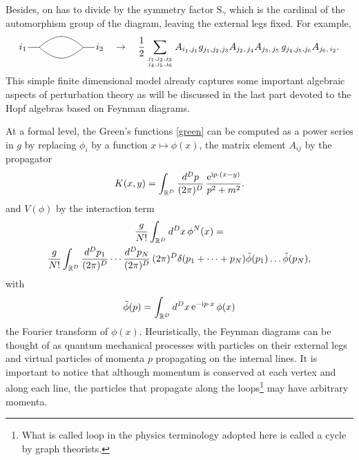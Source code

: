 \documentclass[12pt,here,feynmf]{article}
\begin{document}
Besides, on has to divide by the symmetry factor $\mathrm{S}_{\gamma}$ which is the cardinal of the automorphism group of the diagram, leaving the external legs fixed. For example,
\begin{equation}
i_{1}\,
\xy
(0,0)*{}="A"; 
(16,0)*{}="B"; 
(-4,0)*{}="C"; 
(20,0)*{}="D"; 
"C"; "A" **\crv{(-4,0)&(0,0)};
"A"; "B" **\crv{(0,0)&(8,8)&(16,0)};
"A"; "B" **\crv{(0,0)&(8,-8)&(16,0)};
"B"; "D" **\crv{(16,0)&(20,0)};
\endxy
\,i_{2}\quad
\rightarrow\quad
\frac{1}{2}
\sum_{j_{1},j_{2},j_{3}\atop
j_{4},j_{5},j_{6}}
A_{i_{1},j_{1}}
g_{j_{1},j_{2},j_{3}}
A_{j_{2},\,j_{4}}A_{j_{3},\,j_{5}}\,
g_{j_{4},j_{5},j_{6}}
A_{j_{6},\,i_{2}}.
\end{equation}
This simple finite dimensional model already captures  some important algebraic aspects of perturbation theory as will be discussed in the last part devoted to the Hopf algebras based on Feynman diagrams.

At a formal level, the Green's functions \eqref{green} can be computed as a power series in $g$ by replacing $\phi_{i}$ by a function $x\mapsto\phi(x)$, the matrix element $A_{ij}$ by the propagator
\begin{equation} 
K(x,y)=\int_{{\Bbb R}^{D}}\frac{d^{D}p}{(2\pi)^{D}}\,\frac{\mathrm{e}^{\mathrm{i}p\cdot(x-y)}}{p^{2}+m^{2}}.
\end{equation}
and $V(\phi)$ by the interaction term
\begin{multline}
\frac{g}{N!}\int_{{\Bbb R}^{D}} d^{D}x\,\phi^{N}(x)=\\
\frac{g}{N!}\int_{{\Bbb R}^{D}}\frac{d^{D}p_{1}}{(2\pi)^{D}}\cdots\frac{d^{D}p_{N}}{(2\pi)^{D}}\,(2\pi)^{D}\delta(p_{1}+\cdots+p_{N})\tilde{\phi}(p_{1})\dots\tilde{\phi}(p_{N}),
\end{multline}
with 
\begin{equation}
\tilde{\phi}(p)=\int_{{\Bbb R}^{D}}d^{D}x\,\mathrm{e}^{-\mathrm{i}p\cdot x}\,\phi(x)
\end{equation}
the Fourier transform of $\phi(x)$. Heuristically, the Feynman diagrams can be thought of as quantum mechanical processes with particles on their external legs and virtual particles of momenta $p$ propagating on the internal lines. It is important to notice that although momentum is conserved at each vertex and along each line, the particles that propagate along the loops\footnote{What is called loop in the physics terminology adopted here is called a cycle by graph theorists.} may have arbitrary momenta.
\end{document}
